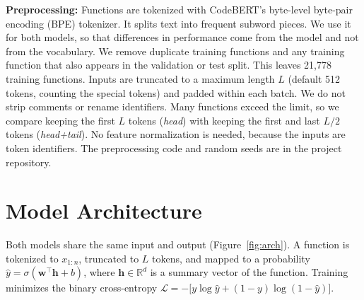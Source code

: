 \documentclass{article}
\begin{document}
\textbf{Preprocessing:}
Functions are tokenized with CodeBERT's byte-level byte-pair encoding (BPE) tokenizer. It splits text into frequent subword pieces. We use it for both models, so that differences in performance come from the model and not from the vocabulary.
We remove duplicate training functions and any training function that also appears in the validation or test split. This leaves 21{,}778 training functions.
Inputs are truncated to a maximum length $L$ (default 512 tokens, counting the special tokens) and padded within each batch. We do not strip comments or rename identifiers.
Many functions exceed the limit, so we compare keeping the first $L$ tokens (\emph{head}) with keeping the first and last $L/2$ tokens (\emph{head+tail}).
No feature normalization is needed, because the inputs are token identifiers. The preprocessing code and random seeds are in the project repository.

\section{Model Architecture}

Both models share the same input and output (Figure~\ref{fig:arch}).
A function is tokenized to $x_{1:n}$, truncated to $L$ tokens, and mapped to a probability $\hat{y}=\sigma(\mathbf{w}^\top \mathbf{h} + b)$, where $\mathbf{h}\in\mathbb{R}^d$ is a summary vector of the function.
Training minimizes the binary cross-entropy $\mathcal{L}=-\big[y\log\hat{y}+(1-y)\log(1-\hat{y})\big]$.
\end{document}
